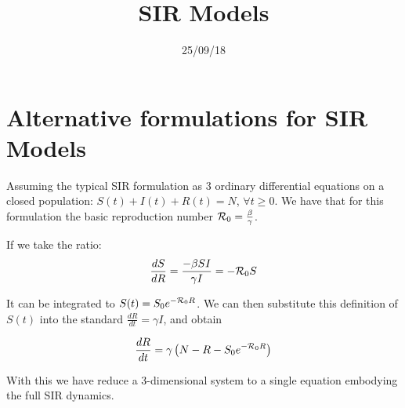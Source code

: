 \documentclass[a4paper,10pt]{article}
\date{25/09/18}
\title{SIR Models}
\begin{document}
\maketitle
 \section*{Alternative formulations for SIR Models}
 
 Assuming the typical SIR formulation as 3 ordinary differential equations on a 
closed population: $S(t)+I(t)+R(t)=N$, $\forall t \geq 0$. We have that for 
this formulation the basic reproduction number ${\cal 
R}_0=\frac{\beta}{\gamma}$.

If we take the ratio:
\begin{equation}
 \frac{dS}{dR} = \frac{-\beta S I}{\gamma I}=-{\cal R}_0 S
\end{equation}

It can be integrated to $S(t)=S_0 e^{-{\cal R}_0 R}$. We can then substitute 
this definition of $S(t)$ into the standard $\frac{dR}{dt}=\gamma I$, and obtain

\begin{equation}
 \frac{dR}{dt}=\gamma\left(N-R-S_0 e^{-{\cal R}_0 R} \right)
\end{equation}

With this we have reduce a 3-dimensional system to a single equation embodying 
the full SIR dynamics.
\end{document}
